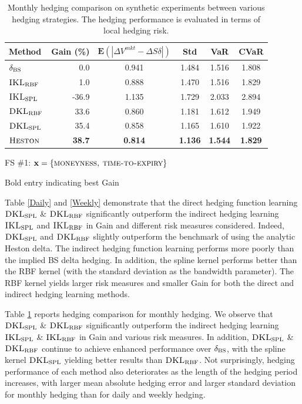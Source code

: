 \documentclass[letterpaper,12pt,titlepage,oneside,final]{book}
\numberwithin{equation}{section}
\theoremstyle{definition}
\newcommand{\vx}{\mathbf{x}}
\newcommand{\E}{\mathbf{E}}
\newcommand{\DS}{\Delta S}
\newcommand{\Heston}{\textsc{Heston}}
\newcommand{\DVmkt}{\Delta V^{mkt}}
\newcommand{\MeanAbs}{\E(|\DVmkt-\DS \delta |)}
\newcommand{\DKLs}{\bf\textsc{DKL}_{\text{SPL}}}
\newcommand{\DKLg}{\bf\textsc{DKL}_{\text{RBF}}}
\newcommand{\IKLs}{\bf\textsc{IKL}_{\text{SPL}}}
\newcommand{\IKLg}{\bf\textsc{IKL}_{\text{RBF}}}
\newcommand{\Del}{\delta_{\textsc{BS}}}
\begin{document}
\begin{table}[htp!]
\begin{center}
\begin{threeparttable}
\begin{tabular}{|l|r c c c c|}
\hline
Method & Gain (\%)& $\MeanAbs$ & Std& VaR & CVaR   \\ \hline
$\Del$ & 0.0 & 0.941 & 1.484 & 1.516 & 1.808 \\
$\IKLg$  & 1.0 & 0.888 & 1.470 & 1.516 & 1.829 \\
$\IKLs$  & -36.9 & 1.135 & 1.729 & 2.033 & 2.894 \\
$\DKLg$  & 33.6 & 0.860 & 1.181 & 1.612 & 1.949 \\
$\DKLs$  & {35.4} & {0.858} & {1.165} & {1.610} & {1.922} \\
$\Heston$ & \textbf{38.7} & \textbf{0.814} & \textbf{1.136} & \textbf{1.544} & \textbf{1.829} \\
\hline
\end{tabular}
\caption{Monthly hedging comparison on synthetic experiments between various hedging strategies. The hedging performance is evaluated in terms of local hedging risk.}
\label{Monthly}
\begin{tablenotes}
    \small
  \item[1] FS \#1: $\vx=\{\textsc{moneyness,~time-to-expiry}\}$
  \item[2] Bold entry indicating best Gain
  \end{tablenotes}
  \end{threeparttable}
  \end{center}
\end{table}


Table \ref{Daily} and \ref{Weekly}  demonstrate that the direct hedging function learning $\DKLs$ \& $\DKLg$  significantly outperform the indirect hedging learning $\IKLs$  and $\IKLg$ in Gain and different risk measures considered. Indeed, $\DKLs$ and $\DKLg$ slightly outperform the benchmark of using the analytic Heston delta.
The indirect hedging function learning performs more poorly than the implied BS delta hedging. In addition,  the spline kernel performs better than the RBF kernel (with the standard deviation as the bandwidth parameter). The RBF kernel yields larger risk measures and smaller Gain  for both the direct and indirect hedging learning methods.

Table \ref{Monthly} reports hedging comparison for monthly hedging. We  observe that  $\DKLs$ \& $\DKLg$  significantly outperform the indirect hedging learning $\IKLs$ \& $\IKLg$ in  Gain and various risk measures. In addition, $\DKLs$ \& $\DKLg$ continue to achieve enhanced performance over $\Del$, with the spline kernel $\DKLs$ yielding better results than $\DKLg$.
Not surprisingly, hedging performance of each method also deteriorates as the length of the hedging period increases,  with larger mean absolute hedging error and larger standard deviation for monthly hedging than for daily and weekly hedging.
\end{document}
